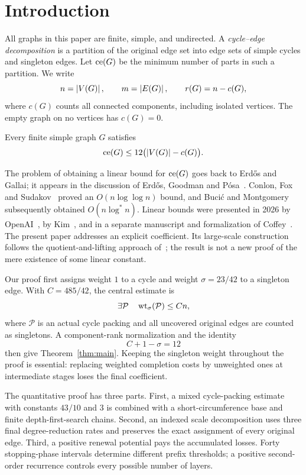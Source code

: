 \section{Introduction}\label{sec:introduction}
All graphs in this paper are finite, simple, and undirected. A
\emph{cycle--edge decomposition} is a partition of the original edge set
into edge sets of simple cycles and singleton edges. Let $\operatorname{ce}(G)$ be the
minimum number of parts in such a partition. We write
\[
 n=\left|V(G)\right|,\qquad m=\left|E(G)\right|,\qquad r(G)=n-c(G),
\]
where $c(G)$ counts all connected components, including isolated vertices.
The empty graph on no vertices has $c(G)=0$.

\begin{theorem}\label{thm:main}
Every finite simple graph $G$ satisfies
\[
                 \operatorname{ce}(G)\le 12\bigl(\left|V(G)\right|-c(G)\bigr).
\]
\end{theorem}

The problem of obtaining a linear bound for $\operatorname{ce}(G)$ goes back to Erd\H{o}s
and Gallai; it appears in the discussion of Erd\H{o}s, Goodman and
P\'osa~\cite{EGP1966}. Conlon, Fox and Sudakov~\cite{CFS2014} proved an
$O(n\log\log n)$ bound, and Buci\'c and Montgomery~\cite{BM2024} subsequently
obtained $O(n\log^*n)$. Linear bounds were presented in 2026 by
OpenAI~\cite{OAI2026}, by Kim~\cite{Kim2026}, and in a separate manuscript
and formalization of Coffey~\cite{Coffey2026}. The present paper addresses an
explicit coefficient. Its large-scale construction follows the
quotient-and-lifting approach of~\cite{OAI2026}; the result is not a new proof
of the mere existence of some linear constant.

Our proof first assigns weight $1$ to a cycle and weight
$\sigma=23/42$ to a singleton edge. With $C=485/42$, the central estimate is
\begin{equation}\label{eq:weighted-order}
 \exists\mathcal P\quad \operatorname{wt}_\sigma(\mathcal P)\le Cn,
\end{equation}
where $\mathcal P$ is an actual cycle packing and all uncovered original
edges are counted as singletons. A component-rank normalization and the
identity
\[
                  C+1-\sigma=12
\]
then give Theorem~\ref{thm:main}. Keeping the singleton weight throughout
the proof is essential: replacing weighted completion costs by unweighted
ones at intermediate stages loses the final coefficient.

The quantitative proof has three parts. First, a mixed cycle-packing estimate
with constants $43/10$ and $3$ is combined with a short-circumference base
and finite depth-first-search chains. Second, an indexed scale decomposition
uses three final degree-reduction rates and preserves the exact assignment of
every original edge. Third, a positive renewal potential pays the accumulated
losses. Forty stopping-phase intervals determine different prefix thresholds;
a positive second-order recurrence controls every possible number of layers.

